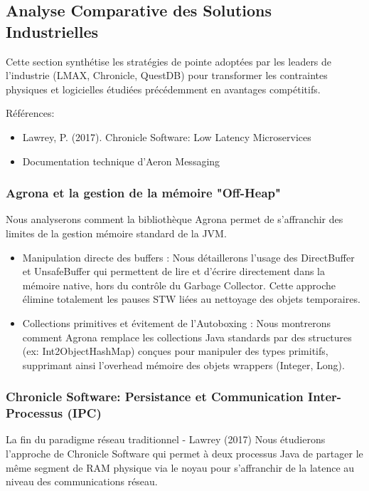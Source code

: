 \subsection{Analyse Comparative des Solutions Industrielles}

Cette section synthétise les stratégies de pointe adoptées par les leaders de l'industrie (LMAX, Chronicle, QuestDB) pour transformer les contraintes physiques et logicielles étudiées précédemment en avantages compétitifs.

Références:

\begin{itemize}
    \item Lawrey, P. (2017). Chronicle Software: Low Latency Microservices
    \item Documentation technique d'Aeron Messaging
\end{itemize}

\subsubsection{Agrona et la gestion de la mémoire "Off-Heap"}

Nous analyserons comment la bibliothèque Agrona permet de s'affranchir des limites de la gestion mémoire standard de la JVM.

\begin{itemize}
    \item Manipulation directe des buffers : Nous détaillerons l'usage des DirectBuffer et UnsafeBuffer qui permettent de lire et d'écrire directement dans la mémoire native, hors du contrôle du Garbage Collector. Cette approche élimine totalement les pauses STW liées au nettoyage des objets temporaires.
    \item Collections primitives et évitement de l'Autoboxing : Nous montrerons comment Agrona remplace les collections Java standards par des structures (ex: Int2ObjectHashMap) conçues pour manipuler des types primitifs, supprimant ainsi l'overhead mémoire des objets wrappers (Integer, Long).
\end{itemize}

\subsubsection{Chronicle Software: Persistance et Communication Inter-Processus (IPC)}

La fin du paradigme réseau traditionnel - Lawrey (2017) Nous étudierons l'approche de Chronicle Software qui permet à deux processus Java de partager le même segment de RAM physique via le noyau pour s'affranchir de la latence au niveau des communications réseau.


